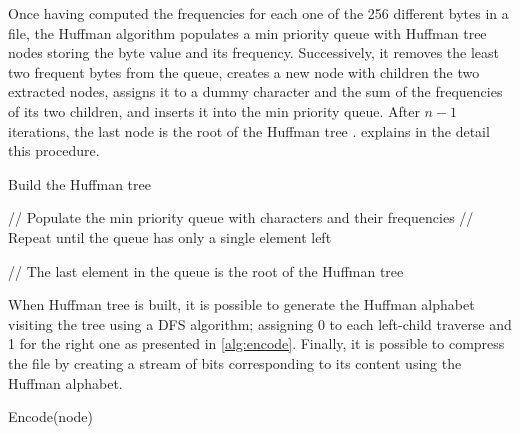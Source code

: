 Once having computed the frequencies for each one of the 256 different bytes in a file, the Huffman algorithm populates a min priority queue with Huffman tree nodes storing the byte value and its frequency. Successively, it removes the least two frequent bytes from the queue, creates a new node with children the two extracted nodes, assigns it to a dummy character and the sum of the frequencies of its two children, and inserts it into the min priority queue. After \(n-1\) iterations, the last node is the root of the Huffman tree \cite{bertossi2010algoritmi}.  explains in the detail this procedure.
\begin{algorithm}
    \caption{Build the Huffman tree}\label{alg:buildtree}

    \SetKwFor{}{}{}{}

    // Populate the min priority queue with characters and their frequencies\;
    // Repeat until the queue has only a single element left\;

    // The last element in the queue is the root of the Huffman tree\;
    \;
\end{algorithm}

When Huffman tree is built, it is possible to generate the Huffman alphabet visiting the tree using a DFS algorithm; assigning 0 to each left-child traverse and 1 for the right one as presented in \cref{alg:encode}. Finally, it is possible to compress the file by creating a stream of bits corresponding to its content using the Huffman alphabet.

\begin{algorithm}
    \caption{Encode(node)}\label{alg:encode}
\end{algorithm}

